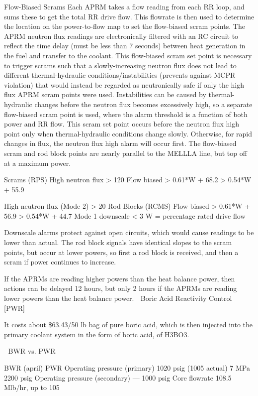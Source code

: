 \documentclass[10pt]{article}
\begin{document}
Flow-Biased Scrams
Each APRM takes a flow reading from each RR loop, and sums these to get the total RR drive flow. This flowrate is then used to determine the location on the power-to-flow map to set the flow-biased scram points. The APRM neutron flux readings are electronically filtered with an RC circuit to reflect the time delay (must be less than 7 seconds) between heat generation in the fuel and transfer to the coolant. This flow-biased scram set point is necessary to trigger scrams such that a slowly-increasing neutron flux does not lead to different thermal-hydraulic conditions/instabilities (prevents against MCPR violation) that would instead be regarded as neutronically safe if only the high flux APRM scram points were used. Instabilities can be caused by thermal-hydraulic changes before the neutron flux becomes excessively high, so a separate flow-biased scram point is used, where the alarm threshold is a function of both power and RR flow. This scram set point occurs before the neutron flux high point only when thermal-hydraulic conditions change slowly. Otherwise, for rapid changes in flux, the neutron flux high alarm will occur first. The flow-biased scram and rod block points are nearly parallel to the MELLLA line, but top off at a maximum power. 

Scrams (RPS)
High neutron flux
> 120%
Flow biased
> 0.61*W + 68.2%
> 0.54*W + 55.9%

High neutron flux (Mode 2)
> 20%
Rod Blocks (RCMS)
Flow biased
> 0.61*W + 56.9%
> 0.54*W + 44.7%
Mode 1 downscale
< 3%
W = percentage rated drive flow

Downscale alarms protect against open circuits, which would cause readings to be lower than actual. The rod block signals have identical slopes to the scram points, but occur at lower powers, so first a rod block is received, and then a scram if power continues to increase. 

If the APRMs are reading higher powers than the heat balance power, then actions can be delayed 12 hours, but only 2 hours if the APRMs are reading lower powers than the heat balance power. 
Boric Acid Reactivity Control [PWR]

It costs about \$63.43/50 lb bag of pure boric acid, which is then injected into the primary coolant system in the form of boric acid, of H3BO3. 


BWR vs. PWR


BWR (april)
PWR
Operating pressure (primary)
1020 psig (1005 actual)
7 MPa
2200 psig
Operating pressure (secondary)
---
1000 psig
Core flowrate
108.5 Mlb/hr, up to 105%
\end{document}
